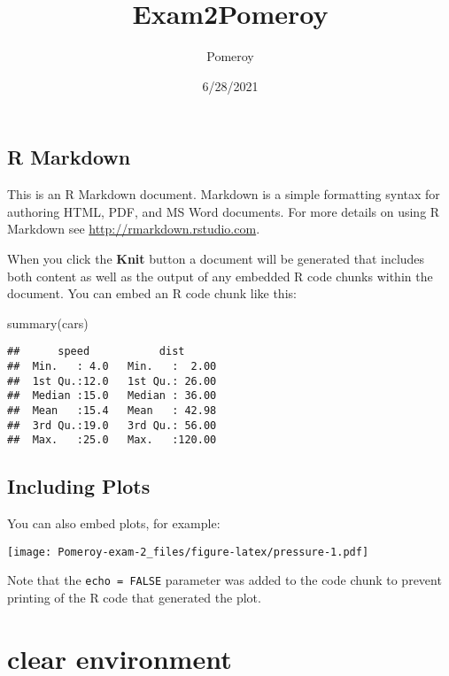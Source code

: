 \documentclass[
]{article}
\title{Exam2Pomeroy}
\author{Pomeroy}
\date{6/28/2021}
\newenvironment{Shaded}{\begin{snugshade}}{\end{snugshade}}
\newcommand{\FunctionTok}[1]{\textcolor[rgb]{0.00,0.00,0.00}{#1}}
\newcommand{\NormalTok}[1]{#1}
\begin{document}
\maketitle

\hypertarget{r-markdown}{%
\subsection{R Markdown}\label{r-markdown}}

This is an R Markdown document. Markdown is a simple formatting syntax
for authoring HTML, PDF, and MS Word documents. For more details on
using R Markdown see \url{http://rmarkdown.rstudio.com}.

When you click the \textbf{Knit} button a document will be generated
that includes both content as well as the output of any embedded R code
chunks within the document. You can embed an R code chunk like this:

\begin{Shaded}
\begin{Highlighting}[]
\FunctionTok{summary}\NormalTok{(cars)}
\end{Highlighting}
\end{Shaded}

\begin{verbatim}
##      speed           dist       
##  Min.   : 4.0   Min.   :  2.00  
##  1st Qu.:12.0   1st Qu.: 26.00  
##  Median :15.0   Median : 36.00  
##  Mean   :15.4   Mean   : 42.98  
##  3rd Qu.:19.0   3rd Qu.: 56.00  
##  Max.   :25.0   Max.   :120.00
\end{verbatim}

\hypertarget{including-plots}{%
\subsection{Including Plots}\label{including-plots}}

You can also embed plots, for example:

\texttt{[image: Pomeroy-exam-2\_files/figure-latex/pressure-1.pdf]}

Note that the \texttt{echo\ =\ FALSE} parameter was added to the code
chunk to prevent printing of the R code that generated the plot.

\hypertarget{clear-environment}{%
\section{clear environment}\label{clear-environment}}
\end{document}
